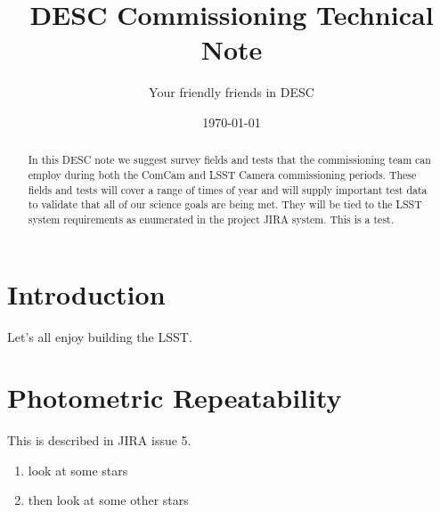 \documentclass[modern]{desc-tex/styles/lsstdescnote}
\begin{document}
\title{DESC Commissioning Technical Note}
\author{Your friendly friends in DESC}
\date{\today}


\begin{abstract}
  In this DESC note we suggest survey fields and tests that the
  commissioning team can employ during both the ComCam and LSST Camera
  commissioning periods.  These fields and tests will cover a range of
  times of year and will supply important test data to validate that
  all of our science goals are being met.  They will be tied to the
  LSST system requirements as enumerated in the project JIRA system. This is a test.
\end{abstract}

\maketitle

\noindent
\begin{center}
  \fboxsep=5pt  
 \end{center} 
\vspace{0.1in}

\section{Introduction}

Let's all enjoy building the LSST.

\section{Photometric Repeatability}

This is described in JIRA issue 5.

\begin{enumerate}
\item look at some stars
\item then look at some other stars
\end{enumerate}

\begin{acknowledgments}

\end{acknowledgments}
  

\end{document}
